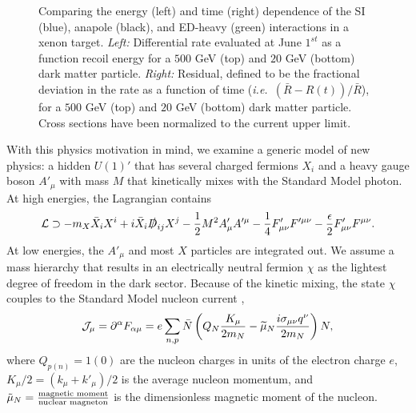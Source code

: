 \documentclass[11pt]{article}
\newcommand{\ie}{{\it i.e.~}}  \newcommand{\eg}{{\it e.g.~}}
\newcommand{\pL}{\left(} \newcommand{\pR}{\right)} \newcommand{\bL}{\left[} \newcommand{\bR}{\right]} \newcommand{\cbL}{\left\{} \newcommand{\cbR}{\right\}} \newcommand{\mL}{\left|} \newcommand{\mR}{\right|} \newcommand{\ER}{E_R}
\newcommand{\beq}{\begin{equation}} \newcommand{\eeq}{\end{equation}}
\begin{document}
\begin{figure}
\caption{\label{fig:diff_rate_comp}
Comparing the energy (left) and time (right) dependence of the SI (blue), anapole (black), and ED-heavy (green) interactions in a xenon target. \emph{Left:} Differential rate evaluated at June $1^{st}$ as a function recoil energy for a $500$ GeV (top) and $20$ GeV (bottom) dark matter particle. \emph{Right:} Residual, defined to be the fractional deviation in the rate as a function of time (\ie $(\bar{R} - R(t))/\bar{R}$), for a $500$ GeV (top) and $20$ GeV (bottom) dark matter particle. Cross sections have been normalized to the current upper limit. }
\end{figure}

With this physics motivation in mind, we examine a generic model of new physics: a hidden $U(1)'$ that has several charged fermions $X_i$ and a heavy gauge boson $A'_\mu$ with mass $M$ that kinetically mixes with the Standard Model photon. At high energies, the Lagrangian contains
\beq \label{eq:UV-model}
\cL \supset -  m_X \bar X_i X^i + i \bar X_i \slashed D_{ij} X^j  - \frac12 M^2 A'_\mu A'^\mu  - \frac14 F'_{\mu \nu} F'^{\mu \nu} - \frac\epsilon2 F'_{\mu \nu} F^{\mu \nu}.
\eeq
At low energies, the $A'_\mu$ and most $X$ particles are integrated out. We assume a mass hierarchy that results in an electrically neutral fermion $\chi$ as the lightest degree of freedom in the dark sector. Because of the kinetic mixing, the state $\chi$ couples to the Standard Model nucleon current \cite{Gresham:2014vja},
\beq \label{eq:current}
\cJ_\mu = \partial^\alpha F_{\alpha \mu} = e \sum_{n,p} \bar N \pL Q_N \frac{K_\mu}{2m_N} -\widetilde \mu_N \frac{i \sigma_{\mu \nu}q^\nu}{2m_N} \pR N,
\eeq 
where $Q_{p(n)}=1(0)$ are the nucleon charges in units of the electron charge $e$, $K_\mu/2 = (k_\mu + k'_\mu)/2$ is the average nucleon momentum, and $\tilde{\mu}_N = {\text{magnetic moment} \over \text{nuclear magneton}}$ is the dimensionless magnetic moment of the nucleon.
\end{document}
